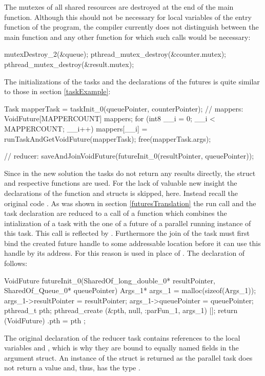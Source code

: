 The mutexes of all shared resources are destroyed at the end of the main function. Although this should not be necessary for local variables of the entry function of the program, the compiler currently does not distinguish between the main function and any other function for which such calls would be necessary:
\begin{ccode}
mutexDestroy_2(&queue); 
pthread_mutex_destroy(&counter.mutex); 
pthread_mutex_destroy(&result.mutex);
\end{ccode}
The initializations of the tasks and the declarations of the futures is quite similar to those in section \ref{taskExample}:
\begin{ccode}
Task mapperTask = taskInit_0(queuePointer, counterPointer);
// mappers:
VoidFuture[MAPPERCOUNT] mappers; 
for (int8 __i = 0; __i < MAPPERCOUNT; __i++) { 
  mappers[__i] = runTaskAndGetVoidFuture(mapperTask); 
}
free(mapperTask.args);

// reducer:
saveAndJoinVoidFuture(futureInit_0(resultPointer, queuePointer));
\end{ccode}

Since in the new solution the tasks do not return any results directly, the  struct and respective functions are used. For the lack of valuable new insight the declarations of the  function and  structs is skipped, here. Instead recall the original code . As was shown in section \ref{futuresTranslation} the run call and the task declaration are reduced to a call of a function which combines the intialization of a task with the one of a future of a parallel running instance of this task. This call is reflected by . Furthermore the join of the task must first bind the created future handle to some addressable location before it can use this handle by its address. For this reason  is used in place of . The declaration of  follows:
\begin{ccode}
VoidFuture futureInit_0(SharedOf_long_double_0* resultPointer, SharedOf_Queue_0* queuePointer) { 
  Args_1* args_1 = malloc(sizeof(Args_1)); 
  args_1->resultPointer = resultPointer; 
  args_1->queuePointer = queuePointer; 
  pthread_t pth; 
  pthread_create (&pth, null, :parFun_1, args_1) |]; 
  return (VoidFuture){ .pth = pth }; 
}
\end{ccode}
The original declaration of the reducer task contains references to the local variables  and , which is why they are bound to equally named fields in the argument struct. An instance of the  struct is returned as the parallel task does not return a value and, thus, has the type .

